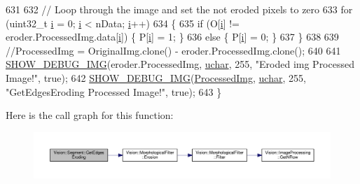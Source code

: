 \begin{DoxyCode}
631 
632         \textcolor{comment}{// Loop through the image and set the not eroded pixels to zero}
633         \textcolor{keywordflow}{for} (uint32\_t \hyperlink{_comparision_pictures_2_createtest_image_8m_a6f6ccfcf58b31cb6412107d9d5281426}{i} = 0; \hyperlink{_comparision_pictures_2_createtest_image_8m_a6f6ccfcf58b31cb6412107d9d5281426}{i} < nData; \hyperlink{_comparision_pictures_2_createtest_image_8m_a6f6ccfcf58b31cb6412107d9d5281426}{i}++)
634         \{
635             \textcolor{keywordflow}{if} (O[\hyperlink{_comparision_pictures_2_createtest_image_8m_a6f6ccfcf58b31cb6412107d9d5281426}{i}] != eroder.ProcessedImg.data[\hyperlink{_comparision_pictures_2_createtest_image_8m_a6f6ccfcf58b31cb6412107d9d5281426}{i}]) \{ P[\hyperlink{_comparision_pictures_2_createtest_image_8m_a6f6ccfcf58b31cb6412107d9d5281426}{i}] = 1; \}
636             \textcolor{keywordflow}{else} \{ P[\hyperlink{_comparision_pictures_2_createtest_image_8m_a6f6ccfcf58b31cb6412107d9d5281426}{i}] = 0; \}
637         \}
638 
639         \textcolor{comment}{//ProcessedImg = OriginalImg.clone() - eroder.ProcessedImg.clone();}
640 
641         \hyperlink{_vision_debug_8h_aae864fa4f990213a4184a209ff236202}{SHOW\_DEBUG\_IMG}(eroder.ProcessedImg, \hyperlink{_soil_math_types_8h_a65f85814a8290f9797005d3b28e7e5fc}{uchar}, 255, \textcolor{stringliteral}{"Eroded img Processed Image!"}, \textcolor{keyword}{
      true});
642         \hyperlink{_vision_debug_8h_aae864fa4f990213a4184a209ff236202}{SHOW\_DEBUG\_IMG}(\hyperlink{class_vision_1_1_image_processing_aa7d65742882cd1b2a1e4e9cb68809211}{ProcessedImg}, \hyperlink{_soil_math_types_8h_a65f85814a8290f9797005d3b28e7e5fc}{uchar}, 255, \textcolor{stringliteral}{"GetEdgesEroding Processed
       Image!"}, \textcolor{keyword}{true});
643     \}
\end{DoxyCode}


Here is the call graph for this function\+:\nopagebreak
\begin{figure}[H]
\begin{center}
\leavevmode
\includegraphics[width=350pt]{class_vision_1_1_segment_af4fe7471c44ded04653f8e3f74162c86_cgraph}
\end{center}
\end{figure}




